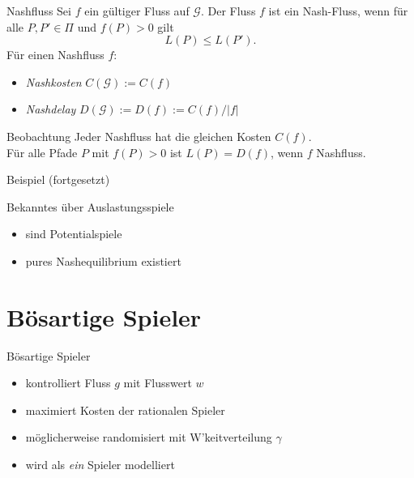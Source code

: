 \documentclass{beamer}
\begin{document}
\begin{frame}{Nashfluss}
	Sei $f$ ein gültiger Fluss auf $\mathcal G$. 
	Der Fluss $f$ ist ein \alert{Nash-Fluss}, wenn für alle $P, P' \in \Pi$ und $f(P) > 0$ gilt
	\[
		L(P) \leq L(P').
	\]
	Für einen Nashfluss $f$:
	\begin{itemize}
		\item \emph{Nashkosten} $C(\mathcal G) := C(f)$
		\item \emph{Nashdelay} $D(\mathcal G) := D(f) := C(f)/|f|$
	\end{itemize}
	
	\begin{block}{Beobachtung}
		Jeder Nashfluss hat die gleichen Kosten $C(f)$. \\
		Für alle Pfade $P$ mit $f(P) > 0$ ist $L(P) = D(f)$, wenn $f$ Nashfluss.
	\end{block}
\end{frame}

\begin{frame}{Beispiel (fortgesetzt)}
\end{frame}

\begin{frame}{Bekanntes über Auslastungsspiele}
	\begin{itemize}
		\item sind Potentialspiele
		\item pures Nashequilibrium existiert
	\end{itemize}
\end{frame}


\section{Bösartige Spieler}
\begin{frame}{Bösartige Spieler}
	\begin{itemize}
		\item kontrolliert Fluss $g$ mit Flusswert $w$
		\item maximiert Kosten der rationalen Spieler
		\item möglicherweise randomisiert mit W'keitverteilung $\gamma$
		\item wird als \emph{ein} Spieler modelliert
	\end{itemize}
\end{frame}
\end{document}

